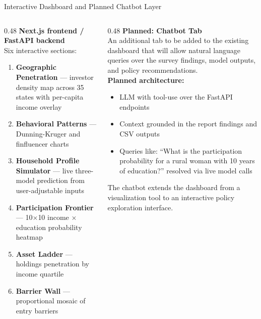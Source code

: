 \documentclass[10pt, aspectratio=169]{beamer}
\begin{document}
\begin{frame}{Interactive Dashboard and Planned Chatbot Layer}
  \begin{columns}[T]
    \begin{column}{0.48\textwidth}
      \textbf{Next.js frontend / FastAPI backend}\\[0.4em]
      Six interactive sections:
      \begin{enumerate}
        \item \textbf{Geographic Penetration} --- investor density map
              across 35 states with per-capita income overlay
        \item \textbf{Behavioral Patterns} --- Dunning-Kruger and
              finfluencer charts
        \item \textbf{Household Profile Simulator} --- live three-model
              prediction from user-adjustable inputs
        \item \textbf{Participation Frontier} --- 10$\times$10 income
              $\times$ education probability heatmap
        \item \textbf{Asset Ladder} --- holdings penetration by income quartile
        \item \textbf{Barrier Wall} --- proportional mosaic of entry barriers
      \end{enumerate}
    \end{column}
    \begin{column}{0.48\textwidth}
      \textbf{Planned: Chatbot Tab}\\[0.4em]
      An additional tab to be added to the existing dashboard that will allow
      natural language queries over the survey findings, model outputs, and
      policy recommendations.\\[0.6em]
      \textbf{Planned architecture:}
      \begin{itemize}
        \item LLM with tool-use over the FastAPI endpoints
        \item Context grounded in the report findings and CSV outputs
        \item Queries like: ``What is the participation probability for
              a rural woman with 10 years of education?'' resolved via
              live model calls
      \end{itemize}
      \vspace{0.4em}
      The chatbot extends the dashboard from a visualization tool to an
      interactive policy exploration interface.
    \end{column}
  \end{columns}
\end{frame}
\end{document}
